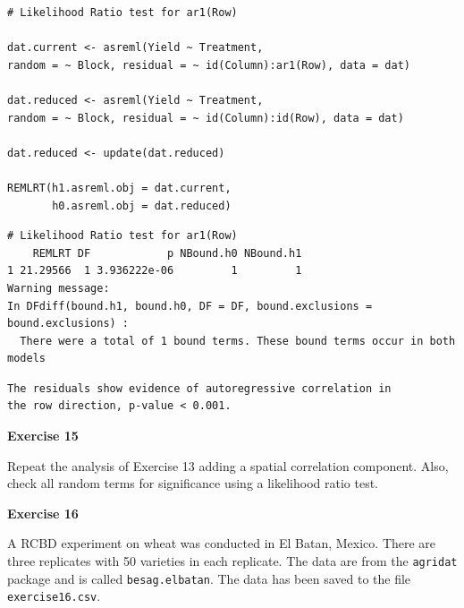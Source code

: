 \documentclass[a4paper, 10pt, fleqn, twosided]{memoir}
\begin{document}
\begin{tcolorbox}[title = Example 6 Likelihood Ratio Test]
\begin{verbatim}
# Likelihood Ratio test for ar1(Row)

dat.current <- asreml(Yield ~ Treatment,
random = ~ Block, residual = ~ id(Column):ar1(Row), data = dat)

dat.reduced <- asreml(Yield ~ Treatment,
random = ~ Block, residual = ~ id(Column):id(Row), data = dat)

dat.reduced <- update(dat.reduced)

REMLRT(h1.asreml.obj = dat.current,
       h0.asreml.obj = dat.reduced)

\end{verbatim}
\end{tcolorbox}

\begin{tcolorbox}[title = Example 6 Likelihood Ratio Test output]
\begin{verbatim}
# Likelihood Ratio test for ar1(Row)
    REMLRT DF            p NBound.h0 NBound.h1
1 21.29566  1 3.936222e-06         1         1
Warning message:
In DFdiff(bound.h1, bound.h0, DF = DF, bound.exclusions = bound.exclusions) :
  There were a total of 1 bound terms. These bound terms occur in both models

\end{verbatim}
\end{tcolorbox}

\begin{tcolorbox}[title = Example 6 Likelihood Ratio Test Interpretation]
\begin{verbatim}
The residuals show evidence of autoregressive correlation in
the row direction, p-value < 0.001.
\end{verbatim}
\end{tcolorbox}

\clearpage
\textbf{Exercise 15}

Repeat the analysis of Exercise 13 adding a spatial correlation component.
Also, check all random terms for significance using a likelihood ratio test.


\textbf{Exercise 16}

A RCBD experiment on wheat was conducted in El Batan, Mexico.  There are three
replicates with 50 varieties in each replicate. The data are from the
\texttt{agridat} package \cite{agridat} and is called \texttt{besag.elbatan}.
The data has been saved to the file \texttt{exercise16.csv}.
\end{document}
